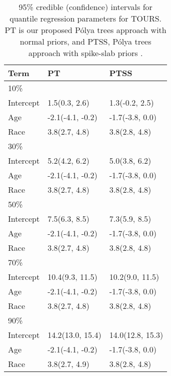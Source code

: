 \documentclass[12pt]{article}
\newcommand{\polya}{P\'{o}lya}
\begin{document}
\begin{table}[h]
  \caption[]{\label{ch2:tab:tours} 95\% credible (confidence) intervals for
    quantile regression parameters for TOURS.
    PT is our proposed \polya{} trees approach with normal priors, and PTSS,
    \polya{} trees approach with spike-slab priors .}
  \vspace{4mm}

  \centering
  \begin{tabular}[tb]{lll}
    \toprule
    Term      & PT               & PTSS             \\
    \hline
    10\%      &                  &                  \\
    Intercept & 1.5(0.3, 2.6)    & 1.3(-0.2, 2.5)   \\
    Age       & -2.1(-4.1, -0.2) & -1.7(-3.8, 0.0)  \\
    Race      & 3.8(2.7, 4.8)    & 3.8(2.8, 4.8)    \\
    30\%      &                  &                  \\
    Intercept & 5.2(4.2, 6.2)    & 5.0(3.8, 6.2)    \\
    Age       & -2.1(-4.1, -0.2) & -1.7(-3.8, 0.0)  \\
    Race      & 3.8(2.7, 4.8)    & 3.8(2.8, 4.8)    \\
    50\%      &                  &                  \\
    Intercept & 7.5(6.3, 8.5)    & 7.3(5.9, 8.5)    \\
    Age       & -2.1(-4.1, -0.2) & -1.7(-3.8, 0.0)  \\
    Race      & 3.8(2.7, 4.8)    & 3.8(2.8, 4.8)    \\
    70\%      &                  &                  \\
    Intercept & 10.4(9.3, 11.5)  & 10.2(9.0, 11.5)  \\
    Age       & -2.1(-4.1, -0.2) & -1.7(-3.8, 0.0)  \\
    Race      & 3.8(2.7, 4.8)    & 3.8(2.8, 4.8)    \\
    90\%      &                  &                  \\
    Intercept & 14.2(13.0, 15.4) & 14.0(12.8, 15.3) \\
    Age       & -2.1(-4.1, -0.2) & -1.7(-3.8, 0.0)  \\
    Race      & 3.8(2.7, 4.9)    & 3.8(2.8, 4.8)    \\
    \bottomrule
  \end{tabular}
\end{table}
\end{document}
